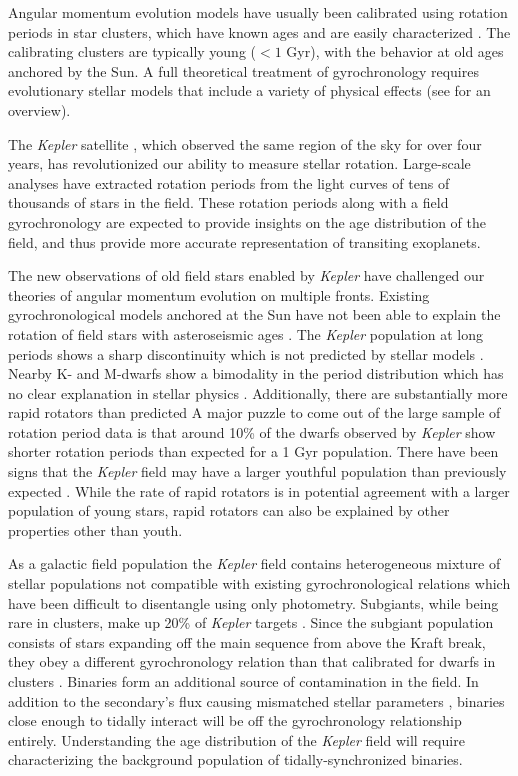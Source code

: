 \documentclass[manuscript]{aastex6}
\newcommand{\Kepler}{\mbox{\textit{Kepler}}}
\begin{document}
Angular momentum evolution models have usually been calibrated using rotation periods in
star clusters, which have known ages and are easily characterized
\citep{Krishnamurthi97, Gallet13, Somers17}. The calibrating clusters are typically
young (\(< 1\) Gyr), with the behavior at old ages anchored by the Sun. A full 
theoretical treatment of gyrochronology requires evolutionary stellar models 
that include a variety of physical effects (see \citet{Gallet13} for an
overview).

The \Kepler{} satellite \citep{Borucki10,Koch10}, which observed the same
region of the sky for over four years, has revolutionized our ability to
measure stellar rotation. Large-scale analyses have extracted rotation periods
from the light curves of tens of thousands of stars \citep{Nielsen13,
Reinhold13, Garcia14, McQuillan14} in the field. These rotation periods along 
with a field gyrochronology are expected to provide insights on the age 
distribution of the field, and thus provide more accurate representation of 
transiting exoplanets.

The new observations of old field stars enabled by \Kepler{} have challenged 
our theories of angular momentum evolution on multiple fronts. Existing 
gyrochronological models anchored at the Sun have not been able to explain
the rotation of field stars with asteroseismic ages \citep{Angus15, 
VanSaders16}. The \Kepler{} population at long periods shows a sharp
discontinuity which is not predicted by stellar models \citep{VanSaders18}. 
Nearby K- and M-dwarfs show a bimodality in the period distribution which has
no clear explanation in stellar physics \citep{Davenport18}. Additionally,
there are substantially more rapid rotators than predicted
A major puzzle to come out of the large sample of rotation period data is that
around 10\% of the dwarfs observed by \Kepler{} show shorter rotation periods 
than expected for a 1 Gyr population. There have been signs that the
\Kepler{} field may have a larger youthful population than previously expected
\citep{Berger18a}. While the rate of rapid rotators is in potential agreement
with a larger population of young stars, rapid rotators can also be explained
by other properties other than youth.


As a galactic field population the \Kepler{} field contains heterogeneous
mixture of stellar populations not compatible with existing gyrochronological
relations which have been difficult to disentangle using only photometry.
Subgiants, while being rare in clusters, make up 20\% of \Kepler{} targets
\citep{Gaidos13, Berger18b}. Since the subgiant population consists of stars
expanding off the main sequence from above the Kraft break, they obey a
different gyrochronology relation than that calibrated for dwarfs in clusters
\citep{vanSaders13}. Binaries form an additional source of contamination in the
field. In addition to the secondary's flux causing mismatched stellar
parameters \citep{ElBadry18,Jackson18}, binaries close enough to tidally
interact will be off the gyrochronology relationship entirely. Understanding
the age distribution of the \Kepler{} field will require characterizing the
background population of tidally-synchronized binaries.
\end{document}
